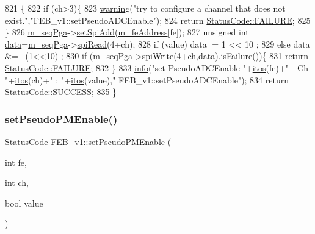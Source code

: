\begin{DoxyCode}
821                                                                  \{
822   \textcolor{keywordflow}{if} (ch>3)\{
823     \hyperlink{classObject_a65cd4fda577711660821fd2cd5a3b4c9}{warning}(\textcolor{stringliteral}{"try to configure a channel that does not exist."},\textcolor{stringliteral}{"FEB\_v1::setPseudoADCEnable"});
824     \textcolor{keywordflow}{return} \hyperlink{classStatusCode_a6f565cbeadc76d14c72f047e5e85eb4ba3da73d4c469762eb9d3c960368252b26}{StatusCode::FAILURE};
825   \}
826   \hyperlink{classFEB__v1_a6c7804ac86796f233a8393043adf2e77}{m\_seqPga}->\hyperlink{classSeqPGA_ac998ce3a6d9b5f2e88cc8393f8c1df53}{setSpiAdd}(\hyperlink{classFEB__v1_a4e1945c2d5b434125f375e9d0fc6d99f}{m\_feAddress}[fe]);
827   \textcolor{keywordtype}{unsigned} \textcolor{keywordtype}{int} \hyperlink{classFEB__v1_a6bca4320bd3bbbc32efc81097f33421a}{data}=\hyperlink{classFEB__v1_a6c7804ac86796f233a8393043adf2e77}{m\_seqPga}->\hyperlink{classSeqPGA_ab3d0e5e5d4014bc7a92588a76b8713d4}{spiRead}(4+ch);
828   \textcolor{keywordflow}{if} (value)  data |= 1 << 10 ;
829   \textcolor{keywordflow}{else}        data &= ~(1<<10) ;
830   \textcolor{keywordflow}{if} (\hyperlink{classFEB__v1_a6c7804ac86796f233a8393043adf2e77}{m\_seqPga}->\hyperlink{classSeqPGA_ad4421841ce4ce8b88ad13f63216f0743}{spiWrite}(4+ch,data).\hyperlink{classStatusCode_a5dd22dc6eb2c52fc4cabc58f6dea2eb7}{isFailure}())\{
831     \textcolor{keywordflow}{return} \hyperlink{classStatusCode_a6f565cbeadc76d14c72f047e5e85eb4ba3da73d4c469762eb9d3c960368252b26}{StatusCode::FAILURE};
832   \}
833   \hyperlink{classObject_a644fd329ea4cb85f54fa6846484b84a8}{info}(\textcolor{stringliteral}{"set PseudoADCEnable "}+\hyperlink{Tools_8h_af330027dbdafb9a30768b3613c553e60}{itos}(fe)+\textcolor{stringliteral}{" - Ch "}+\hyperlink{Tools_8h_af330027dbdafb9a30768b3613c553e60}{itos}(ch)+\textcolor{stringliteral}{" : "}+\hyperlink{Tools_8h_af330027dbdafb9a30768b3613c553e60}{itos}(value),\textcolor{stringliteral}{"
      FEB\_v1::setPseudoADCEnable"});
834   \textcolor{keywordflow}{return} \hyperlink{classStatusCode_a6f565cbeadc76d14c72f047e5e85eb4badd0da38d3ba0d922efd1f4619bc37ad8}{StatusCode::SUCCESS};
835 \}
\end{DoxyCode}
\mbox{\label{classFEB__v1_af422c3cf889440d5d49cce51d98b496e}} 
\subsubsection{\texorpdfstring{set\+Pseudo\+P\+M\+Enable()}{setPseudoPMEnable()}}
{\footnotesize\ttfamily \hyperlink{classStatusCode}{Status\+Code} F\+E\+B\+\_\+v1\+::set\+Pseudo\+P\+M\+Enable (\begin{DoxyParamCaption}\item[{int}]{fe,  }\item[{int}]{ch,  }\item[{bool}]{value }\end{DoxyParamCaption})}



